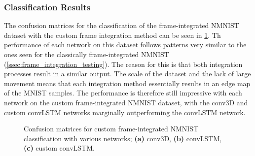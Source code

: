 \subsubsection{Classification Results}

The confusion matrices for the classification of the frame-integrated NMNIST dataset with the custom frame integration method can be seen in \cref{fig:nmnist_custom_frame_c_matrices}. Th performance of each network on this dataset follows patterns very similar to the ones seen for the classically frame-integrated NMNIST (\cref{ssec:frame_integration_testing}). The reason for this is that both integration processes result in a similar output. The scale of the dataset and the lack of large movement means that each integration method essentially results in an edge map of the MNIST samples. The performance is therefore still impressive with each network on the custom frame-integrated NMNIST dataset, with the conv3D and custom convLSTM networks marginally outperforming the convLSTM network.

\begin{figure}[htb]%
    \centering
    \qquad
    \qquad
    \caption{Confusion matrices for custom frame-integrated NMNIST classification with various networks; \textbf{(a)} conv3D, \textbf{(b)} convLSTM, \textbf{(c)} custom convLSTM.}%
    \label{fig:nmnist_custom_frame_c_matrices}%
\end{figure}

